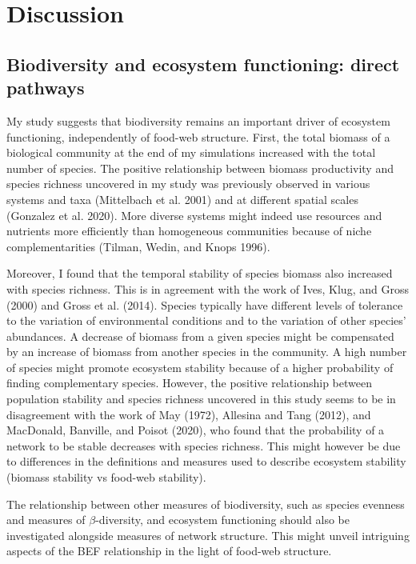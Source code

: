 \documentclass[11pt]{article}
\begin{document}
\hypertarget{discussion}{%
\section{Discussion}\label{discussion}}

\hypertarget{biodiversity-and-ecosystem-functioning-direct-pathways}{%
\subsection{Biodiversity and ecosystem functioning: direct
pathways}\label{biodiversity-and-ecosystem-functioning-direct-pathways}}

My study suggests that biodiversity remains an important driver of
ecosystem functioning, independently of food-web structure. First, the
total biomass of a biological community at the end of my simulations
increased with the total number of species. The positive relationship
between biomass productivity and species richness uncovered in my study
was previously observed in various systems and taxa (Mittelbach et al.
2001) and at different spatial scales (Gonzalez et al. 2020). More
diverse systems might indeed use resources and nutrients more
efficiently than homogeneous communities because of niche
complementarities (Tilman, Wedin, and Knops 1996).

Moreover, I found that the temporal stability of species biomass also
increased with species richness. This is in agreement with the work of
Ives, Klug, and Gross (2000) and Gross et al. (2014). Species typically
have different levels of tolerance to the variation of environmental
conditions and to the variation of other species' abundances. A decrease
of biomass from a given species might be compensated by an increase of
biomass from another species in the community. A high number of species
might promote ecosystem stability because of a higher probability of
finding complementary species. However, the positive relationship
between population stability and species richness uncovered in this
study seems to be in disagreement with the work of May (1972), Allesina
and Tang (2012), and MacDonald, Banville, and Poisot (2020), who found
that the probability of a network to be stable decreases with species
richness. This might however be due to differences in the definitions
and measures used to describe ecosystem stability (biomass stability vs
food-web stability).

The relationship between other measures of biodiversity, such as species
evenness and measures of \(\beta\)-diversity, and ecosystem functioning
should also be investigated alongside measures of network structure.
This might unveil intriguing aspects of the BEF relationship in the
light of food-web structure.
\end{document}
